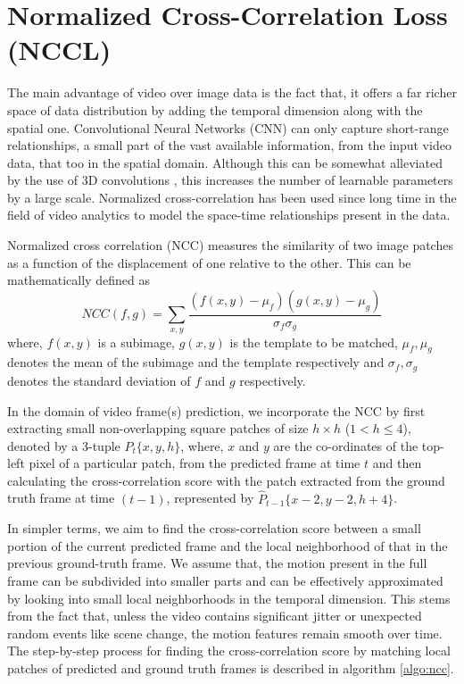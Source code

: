 \documentclass{article}
\begin{document}
\section{Normalized Cross-Correlation Loss (NCCL)}
  \label{sec:nccl}
  The main advantage of video over image data is the fact that, it offers a far richer space of data distribution by adding the temporal dimension along with the spatial one. Convolutional Neural Networks (CNN) can only capture short-range relationships, a small part of the vast available information, from the input video data, that too in the spatial domain. Although this can be somewhat alleviated by the use of 3D convolutions \cite{ji20133d}, this increases the number of learnable parameters by a large scale. Normalized cross-correlation has been used since long time in the field of video analytics \cite{bovik2009essential, briechle2001template, nakhmani2013new, luo2010fast} to model the space-time relationships present in the data.
  
  Normalized cross correlation (NCC) measures the similarity of two image patches as a function of the displacement of one relative to the other. This can be mathematically defined as
  \begin{equation}
  	NCC(f, g) = \sum_{x, y}^{}\frac{(f(x, y) - \mu_f)(g(x, y) - \mu_g)}{\sigma_f \sigma_g}
  	\label{eq:ncc}
  \end{equation}
  where, $ f(x, y) $ is a subimage, $ g(x, y) $ is the template to be matched, $ \mu_f, \mu_g $ denotes the mean of the subimage and the template respectively and $ \sigma_f, \sigma_g $ denotes the standard deviation of $ f $ and $ g $ respectively.
  
  In the domain of video frame(s) prediction, we incorporate the NCC by first extracting small non-overlapping square patches of size $ h \times h $ ($ 1 < h \leq 4 $), denoted by a 3-tuple $ P_t\{x, y, h\} $, where, $ x $ and $ y $ are the co-ordinates of the top-left pixel of a particular patch, from the predicted frame at time $ t $ and then calculating the cross-correlation score with the patch extracted from the ground truth frame at time $ (t-1) $, represented by $ \hat{P}_{t-1}\{x-2, y-2, h+4\} $. 
  
  In simpler terms, we aim to find the cross-correlation score between a small portion of the current predicted frame and the local neighborhood of that in the previous ground-truth frame. We assume that, the motion present in the full frame can be subdivided into smaller parts and can be effectively approximated by looking into small local neighborhoods in the temporal dimension. This stems from the fact that, unless the video contains significant jitter or unexpected random events like scene change, the motion features remain smooth over time. The step-by-step process for finding the cross-correlation score by matching local patches of predicted and ground truth frames is described in algorithm \ref{algo:ncc}.
  
\end{document}
